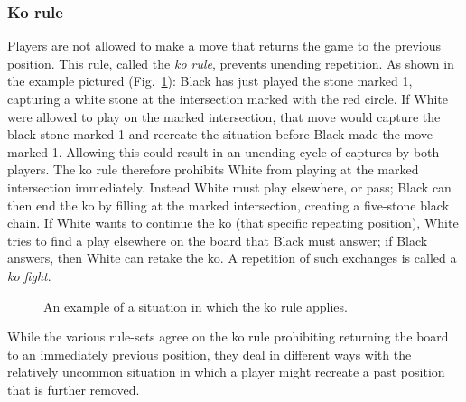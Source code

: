 \subsubsection{Ko rule}
Players are not allowed to make a move that returns the game to the previous position. This rule, called the \emph{ko rule}, prevents unending repetition. As shown in the example pictured (Fig.~\ref{KoRule}): Black has just played the stone marked 1, capturing a white stone at the intersection marked with the red circle. If White were allowed to play on the marked intersection, that move would capture the black stone marked 1 and recreate the situation before Black made the move marked 1. Allowing this could result in an unending cycle of captures by both players. The ko rule therefore prohibits White from playing at the marked intersection immediately. Instead White must play elsewhere, or pass; Black can then end the ko by filling at the marked intersection, creating a five-stone black chain. If White wants to continue the ko (that specific repeating position), White tries to find a play elsewhere on the board that Black must answer; if Black answers, then White can retake the ko. A repetition of such exchanges is called a \emph{ko fight}.
\begin{figure}[h!t]
\centering
{}
\caption{An example of a situation in which the ko rule applies.}\label{KoRule}
\end{figure}

While the various rule-sets agree on the ko rule prohibiting returning the board to an immediately previous position, they deal in different ways with the relatively uncommon situation in which a player might recreate a past position that is further removed.
